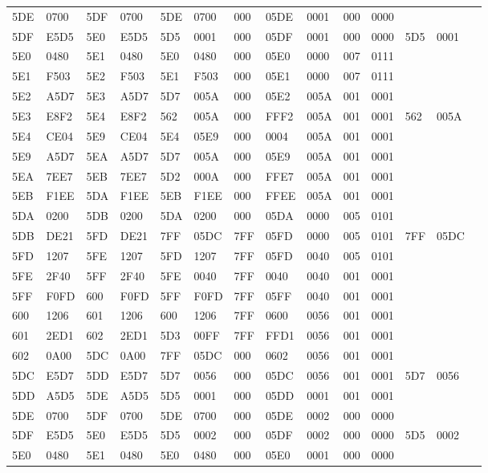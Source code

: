 \begin{tabular}{|*{14}{l|}}
5DE & 0700 & 5DF & 0700 & 5DE & 0700 & 000 & 05DE & 0001 & 000 & 0000 & &\\
5DF & E5D5 & 5E0 & E5D5 & 5D5 & 0001 & 000 & 05DF & 0001 & 000 & 0000 & 5D5 & 0001\\
5E0 & 0480 & 5E1 & 0480 & 5E0 & 0480 & 000 & 05E0 & 0000 & 007 & 0111 & &\\
5E1 & F503 & 5E2 & F503 & 5E1 & F503 & 000 & 05E1 & 0000 & 007 & 0111 & &\\
5E2 & A5D7 & 5E3 & A5D7 & 5D7 & 005A & 000 & 05E2 & 005A & 001 & 0001 & &\\
5E3 & E8F2 & 5E4 & E8F2 & 562 & 005A & 000 & FFF2 & 005A & 001 & 0001 & 562 & 005A\\
5E4 & CE04 & 5E9 & CE04 & 5E4 & 05E9 & 000 & 0004 & 005A & 001 & 0001 & &\\
5E9 & A5D7 & 5EA & A5D7 & 5D7 & 005A & 000 & 05E9 & 005A & 001 & 0001 & &\\
5EA & 7EE7 & 5EB & 7EE7 & 5D2 & 000A & 000 & FFE7 & 005A & 001 & 0001 & &\\
5EB & F1EE & 5DA & F1EE & 5EB & F1EE & 000 & FFEE & 005A & 001 & 0001 & &\\
5DA & 0200 & 5DB & 0200 & 5DA & 0200 & 000 & 05DA & 0000 & 005 & 0101 & &\\
5DB & DE21 & 5FD & DE21 & 7FF & 05DC & 7FF & 05FD & 0000 & 005 & 0101 & 7FF & 05DC\\
5FD & 1207 & 5FE & 1207 & 5FD & 1207 & 7FF & 05FD & 0040 & 005 & 0101 & &\\
5FE & 2F40 & 5FF & 2F40 & 5FE & 0040 & 7FF & 0040 & 0040 & 001 & 0001 & &\\
5FF & F0FD & 600 & F0FD & 5FF & F0FD & 7FF & 05FF & 0040 & 001 & 0001 & &\\
600 & 1206 & 601 & 1206 & 600 & 1206 & 7FF & 0600 & 0056 & 001 & 0001 & &\\
601 & 2ED1 & 602 & 2ED1 & 5D3 & 00FF & 7FF & FFD1 & 0056 & 001 & 0001 & &\\
602 & 0A00 & 5DC & 0A00 & 7FF & 05DC & 000 & 0602 & 0056 & 001 & 0001 & &\\
5DC & E5D7 & 5DD & E5D7 & 5D7 & 0056 & 000 & 05DC & 0056 & 001 & 0001 & 5D7 & 0056\\
5DD & A5D5 & 5DE & A5D5 & 5D5 & 0001 & 000 & 05DD & 0001 & 001 & 0001 & &\\
5DE & 0700 & 5DF & 0700 & 5DE & 0700 & 000 & 05DE & 0002 & 000 & 0000 & &\\
5DF & E5D5 & 5E0 & E5D5 & 5D5 & 0002 & 000 & 05DF & 0002 & 000 & 0000 & 5D5 & 0002\\
5E0 & 0480 & 5E1 & 0480 & 5E0 & 0480 & 000 & 05E0 & 0001 & 000 & 0000 & &\\

\end{tabular}
